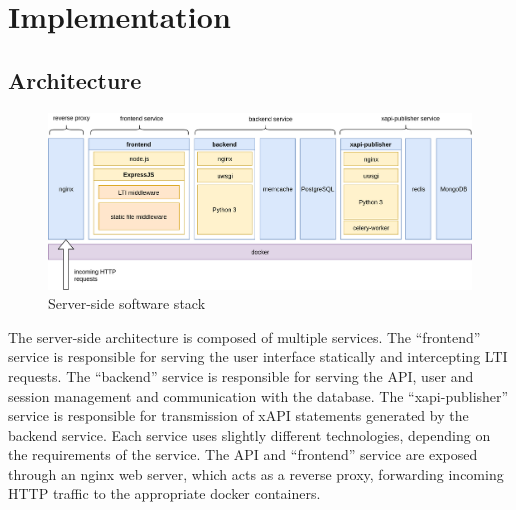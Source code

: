 \documentclass[a4paper,11pt]{article}
\begin{document}
        \section{Implementation}
        \subsection{Architecture}
            \begin{figure}[H]
                \centering
                \includegraphics[width=\textwidth]{stack}
                \caption{Server-side software stack}
                \label{fig:stack}
            \end{figure}

            The server-side architecture is composed of multiple services.
            The ``frontend'' service is responsible for serving the
            user interface statically and intercepting LTI requests.
            The ``backend'' service is responsible for serving the API,
            user and session management and communication with the database.
            The ``xapi-publisher'' service is responsible for transmission
            of xAPI statements generated by the backend service.
            Each service uses slightly different technologies, depending
            on the requirements of the service. The API and ``frontend'' service
            are exposed through an nginx web server, which acts as a reverse
            proxy, forwarding incoming HTTP traffic to the appropriate docker
            containers.
\end{document}
